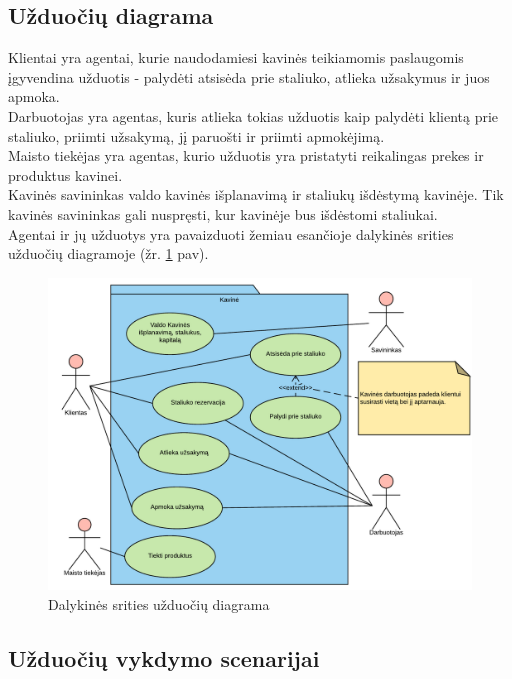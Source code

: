 \documentclass{VUMIFPSkursinis}
\begin{document}
\subsection{Užduočių diagrama}
Klientai  yra  agentai,  kurie  naudodamiesi  kavinės  teikiamomis 
paslaugomis  įgyvendina  užduotis - palydėti  atsisėda  prie  staliuko,  atlieka  užsakymus  ir  juos apmoka. \\
Darbuotojas yra agentas, kuris atlieka tokias užduotis kaip palydėti klientą prie staliuko, 
priimti užsakymą, jį paruošti ir priimti apmokėjimą.\\
Maisto tiekėjas yra agentas, kurio užduotis yra pristatyti reikalingas prekes ir produktus kavinei.\\
Kavinės savininkas valdo kavinės išplanavimą ir staliukų išdėstymą kavinėje. Tik kavinės savininkas gali nuspręsti, kur kavinėje bus išdėstomi staliukai.\\
Agentai ir jų užduotys yra pavaizduoti žemiau esančioje dalykinės srities užduočių diagramoje (žr. \ref{fig:diagrama2} pav).\\


	\begin {figure}[H]
	\centering
		
		\includegraphics[scale=0.9]{img/3lab/Diagrama2}
		\caption{Dalykinės srities užduočių diagrama}
		\label{fig:diagrama2}
	\end{figure}

\subsection{Užduočių vykdymo scenarijai}
\end{document}
